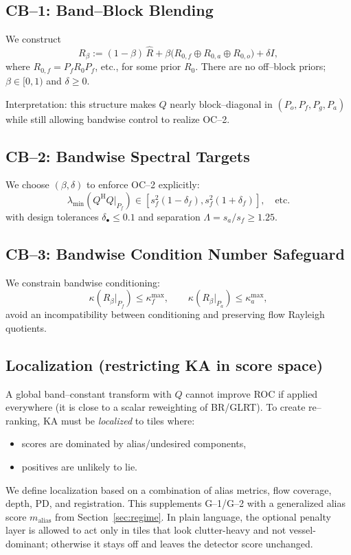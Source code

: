 \documentclass[11pt]{article}
\newcommand{\wh}{\widehat}
\newcommand{\Hh}{^{\mathrm{H}}}
\newcommand{\Pf}{P_f}
\newcommand{\Pa}{P_a}
\newcommand{\Po}{P_o}
\newcommand{\Pg}{P_g}
\begin{document}
\subsection{CB--1: Band--Block Blending}

We construct
\[
R_\beta := (1-\beta)\,\wh R + \beta \bigl(R_{0,f}\oplus R_{0,a}\oplus R_{0,o}\bigr) + \delta I,
\]
where $R_{0,f} = \Pf R_0 \Pf$, etc., for some prior $R_0$. There are no off--block priors; $\beta\in[0,1)$ and $\delta\ge 0$.

Interpretation: this structure makes $Q$ nearly block--diagonal in $(\Po,\Pf,\Pg,\Pa)$ while still allowing bandwise control to realize OC--2.

\subsection{CB--2: Bandwise Spectral Targets}

We choose $(\beta,\delta)$ to enforce OC--2 explicitly:
\[
\lambda_{\min}(Q\Hh Q|_{\Pf}) \in [s_f^2(1-\delta_f), s_f^2(1+\delta_f)],\quad\text{etc.}
\]
with design tolerances $\delta_\bullet\le 0.1$ and separation $\Lambda = s_a/s_f \ge 1.25$.

\subsection{CB--3: Bandwise Condition Number Safeguard}

We constrain bandwise conditioning:
\[
\kappa(R_\beta|_{\Pf}) \le \kappa_f^{\max},\qquad
\kappa(R_\beta|_{\Pa}) \le \kappa_a^{\max},
\]
avoid an incompatibility between conditioning and preserving flow Rayleigh quotients.

\subsection{Localization (restricting KA in score space)}
\label{app:gating}

A global band--constant transform with $Q$ cannot improve ROC if applied everywhere (it is close to a scalar reweighting of BR/GLRT). To create re--ranking, KA must be \emph{localized} to tiles where:
\begin{itemize}[nosep]
  \item scores are dominated by alias/undesired components,
  \item positives are unlikely to lie.
\end{itemize}

We define localization based on a combination of alias metrics, flow coverage, depth, PD, and registration. This supplements G--1/G--2 with a generalized alias score $m_{\mathrm{alias}}$ from Section~\ref{sec:regime}.
In plain language, the optional penalty layer is allowed to act only in tiles that look clutter-heavy and not vessel-dominant; otherwise it stays off and leaves the detector score unchanged.
\end{document}
